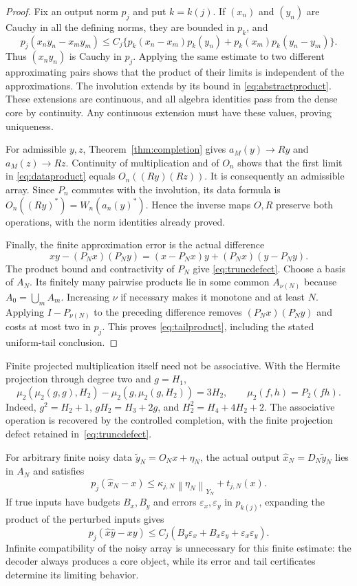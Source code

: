 \documentclass[11pt,a4paper]{amsart}
\numberwithin{equation}{section}
\theoremstyle{definition}
\theoremstyle{remark}
\newcommand{\norm}[1]{\left\lVert#1\right\rVert}
\begin{document}
\begin{proof}
Fix an output norm $p_j$ and put $k=k(j)$. If $(x_n)$ and $(y_n)$ are Cauchy in all the defining norms, they are bounded in $p_k$, and
\[
 p_j(x_ny_n-x_my_m)
 \le C_j\{p_k(x_n-x_m)p_k(y_n)+p_k(x_m)p_k(y_n-y_m)\}.
\]
Thus $(x_ny_n)$ is Cauchy in $p_j$. Applying the same estimate to two different approximating pairs shows that the product of their limits is independent of the approximations. The involution extends by its bound in \eqref{eq:abstractproduct}. These extensions are continuous, and all algebra identities pass from the dense core by continuity. Any continuous extension must have these values, proving uniqueness.

For admissible $y,z$, Theorem~\ref{thm:completion} gives $a_M(y)\to Ry$ and $a_M(z)\to Rz$. Continuity of multiplication and of $O_n$ shows that the first limit in \eqref{eq:dataproduct} equals $O_n((Ry)(Rz))$. It is consequently an admissible array. Since $P_n$ commutes with the involution, its data formula is $O_n((Ry)^*)=W_n(a_n(y)^*)$. Hence the inverse maps $O,R$ preserve both operations, with the norm identities already proved.

Finally, the finite approximation error is the actual difference
\[
 xy-(P_Nx)(P_Ny)=(x-P_Nx)y+(P_Nx)(y-P_Ny).
\]
The product bound and contractivity of $P_N$ give \eqref{eq:truncdefect}. Choose a basis of $A_N$. Its finitely many pairwise products lie in some common $A_{\nu(N)}$ because $A_0=\bigcup_mA_m$. Increasing $\nu$ if necessary makes it monotone and at least $N$. Applying $I-P_{\nu(N)}$ to the preceding difference removes $(P_Nx)(P_Ny)$ and costs at most two in $p_j$. This proves \eqref{eq:tailproduct}, including the stated uniform-tail conclusion.
\end{proof}

Finite projected multiplication itself need not be associative. With the Hermite projection through degree two and $g=H_1$,
\[
 \mu_2(\mu_2(g,g),H_2)-\mu_2(g,\mu_2(g,H_2))=3H_2,
 \qquad\mu_2(f,h)=P_2(fh).
\]
Indeed, $g^2=H_2+1$, $gH_2=H_3+2g$, and $H_2^2=H_4+4H_2+2$. The associative operation is recovered by the controlled completion, with the finite projection defect retained in~\eqref{eq:truncdefect}.

For arbitrary finite noisy data $\widetilde y_N=O_Nx+\eta_N$, the actual output $\widehat x_N=D_N\widetilde y_N$ lies in $A_N$ and satisfies
\begin{equation}\label{eq:generalnoise}
 p_j(\widehat x_N-x)\le\kappa_{j,N}\norm{\eta_N}_{Y_N}+t_{j,N}(x).
\end{equation}
If true inputs have budgets $B_x,B_y$ and errors $\varepsilon_x,\varepsilon_y$ in $p_{k(j)}$, expanding the product of the perturbed inputs gives
\begin{equation}\label{eq:abstractnoiseproduct}
 p_j(\widehat x\widehat y-xy)
 \le C_j(B_y\varepsilon_x+B_x\varepsilon_y+\varepsilon_x\varepsilon_y).
\end{equation}
Infinite compatibility of the noisy array is unnecessary for this finite estimate: the decoder always produces a core object, while its error and tail certificates determine its limiting behavior.
\end{document}
